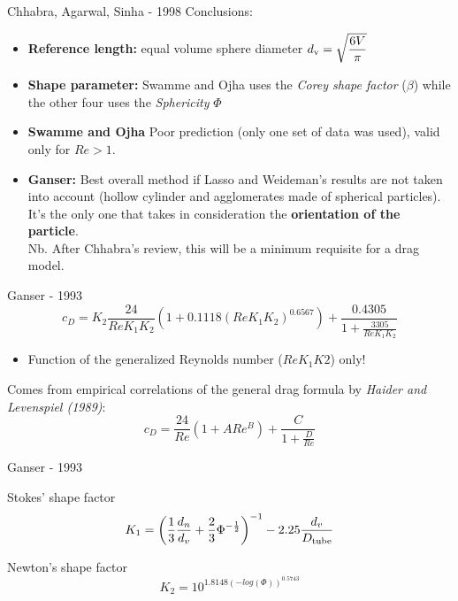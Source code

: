 \documentclass[11pt]{beamer}
\begin{document}
	\begin{frame}{Chhabra, Agarwal, Sinha - 1998}
		Conclusions:
		\begin{itemize}
			\item \textbf{Reference length:} equal volume sphere diameter $ d_{\textup{v}} = \sqrt{\dfrac{6 V}{\pi}} $
			\item \textbf{Shape parameter:} Swamme and Ojha uses the \textit{Corey shape factor} ($ \beta $) while the other four uses the \textit{Sphericity} $ \Phi $
			\item \textbf{Swamme and Ojha} Poor prediction (only one set of data was used), valid only for $ Re > 1 $.
			\item \textbf{Ganser:} Best overall method if Lasso and Weideman's results are not taken into account (hollow cylinder and agglomerates made of spherical particles). It's the only one that takes in consideration the \textbf{orientation of the particle}.\\
			Nb. After Chhabra's review, this will be a minimum requisite for a drag model.
		\end{itemize}
	\end{frame}

	\begin{frame}{Ganser - 1993}
		\begin{equation*}
		c_D = K_2 \frac{24}{Re K_1 K_2} (1 + 0.1118 (Re K_1 K_2)^{0.6567}) + \frac{0.4305}{1 + \frac{3305}{Re K_1 K_2}}
		\end{equation*}
		\begin{itemize}
			\item Function of the generalized Reynolds number ($ Re K_1 K2 $) only!
		\end{itemize}
		\vfill
		Comes from empirical correlations of the general drag formula by \textit{Haider and Levenspiel (1989)}:
		\begin{equation*}
		c_D = \frac{24}{Re} (1 + A Re^B) + \dfrac{C}{1 + \frac{D}{Re}}
		\end{equation*}
	\end{frame}
	
	\begin{frame}{Ganser - 1993}
		\begin{block}{Stokes' shape factor}
			\begin{equation*}
			K_1 = \left( \frac{1}{3} \frac{d_n}{d_v} + \frac{2}{3} \Phi^{-\frac{1}{2}} \right)^{-1} -2.25 \frac{d_v}{D_{\textup{tube}}} 
			\end{equation*}
		\end{block}
		\begin{block}{Newton's shape factor}
			\begin{equation*}
			K_2 = 10^{1.8148 (-log(\Phi))^{0.5743}}
			\end{equation*}
		\end{block}
	\end{frame}
\end{document}
